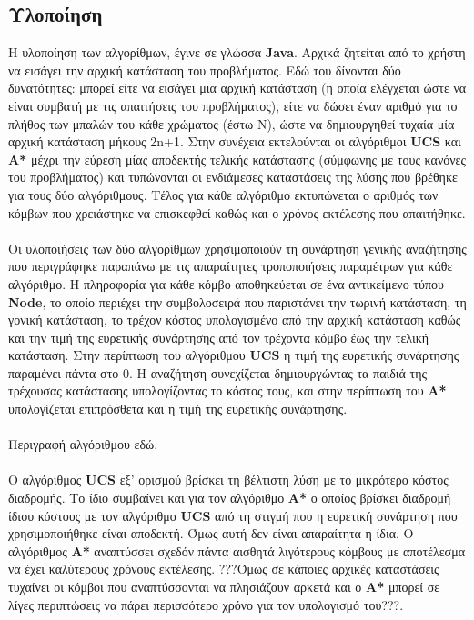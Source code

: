 \documentclass{article}
\begin{document}
    \subsection*{Υλοποίηση}
        Η υλοποίηση των αλγορίθμων, έγινε σε γλώσσα \textbf{Java}. Αρχικά ζητείται από το χρήστη να εισάγει την αρχική κατάσταση του προβλήματος. Εδώ του δίνονται δύο δυνατότητες: μπορεί είτε να εισάγει μια αρχική κατάσταση (η οποία ελέγχεται ώστε να είναι συμβατή με τις απαιτήσεις του προβλήματος), είτε να δώσει έναν αριθμό για το πλήθος των μπαλών του κάθε χρώματος (έστω Ν), ώστε να δημιουργηθεί τυχαία μία αρχική κατάσταση μήκους 2n+1. Στην συνέχεια εκτελούνται οι αλγόριθμοι \textbf{UCS} και \textbf{A*} μέχρι την εύρεση μίας αποδεκτής τελικής κατάστασης (σύμφωνης με τους κανόνες του προβλήματος) και τυπώνονται οι ενδιάμεσες καταστάσεις της λύσης που βρέθηκε για τους δύο αλγόριθμους. Τέλος για κάθε αλγόριθμο εκτυπώνεται ο αριθμός των κόμβων που χρειάστηκε να επισκεφθεί καθώς και ο χρόνος εκτέλεσης που απαιτήθηκε.\\\\
        Οι υλοποιήσεις των δύο αλγορίθμων χρησιμοποιούν τη συνάρτηση γενικής αναζήτησης που περιγράφηκε παραπάνω με τις απαραίτητες τροποποιήσεις παραμέτρων για κάθε αλγόριθμο. Η πληροφορία για κάθε κόμβο αποθηκεύεται σε ένα αντικείμενο τύπου \textbf{Node}, το οποίο περιέχει την συμβολοσειρά που παριστάνει την τωρινή κατάσταση, τη γονική κατάσταση, το τρέχον κόστος υπολογισμένο από την αρχική κατάσταση καθώς και την τιμή της ευρετικής συνάρτησης από τον τρέχοντα κόμβο έως την τελική κατάσταση. Στην περίπτωση του αλγόριθμου \textbf{UCS} η τιμή της ευρετικής συνάρτησης παραμένει πάντα στο 0. Η αναζήτηση συνεχίζεται δημιουργώντας τα παιδιά της τρέχουσας κατάστασης υπολογίζοντας το κόστος τους, και στην περίπτωση του \textbf{Α*} υπολογίζεται επιπρόσθετα και η τιμή της ευρετικής συνάρτησης.\\\\
        
        Περιγραφή αλγόριθμου εδώ.\\\\
        Ο αλγόριθμος \textbf{UCS} εξ' ορισμού βρίσκει τη βέλτιστη λύση με το μικρότερο κόστος διαδρομής. Το ίδιο συμβαίνει και για τον αλγόριθμο \textbf{Α*} ο οποίος βρίσκει διαδρομή ίδιου κόστους με τον αλγόριθμο \textbf{UCS} από τη στιγμή που η ευρετική συνάρτηση που χρησιμοποιήθηκε είναι αποδεκτή. Όμως αυτή δεν είναι απαραίτητα η ίδια. Ο αλγόριθμος \textbf{A*} αναπτύσσει σχεδόν πάντα αισθητά λιγότερους κόμβους με αποτέλεσμα να έχει καλύτερους χρόνους εκτέλεσης. ???Όμως σε κάποιες αρχικές καταστάσεις τυχαίνει οι κόμβοι που αναπτύσσονται να πλησιάζουν αρκετά και ο \textbf{A*} μπορεί σε λίγες περιπτώσεις να πάρει περισσότερο χρόνο για τον υπολογισμό του???.\\\\
        
\end{document}
